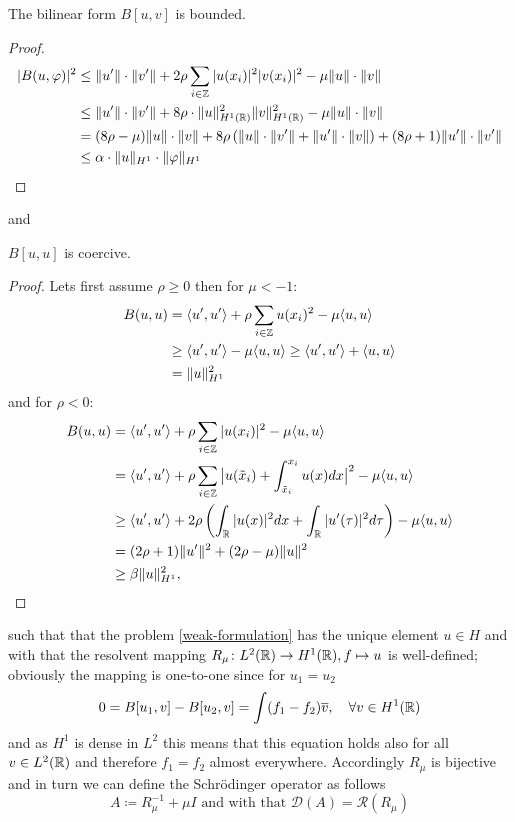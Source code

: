 \begin{theorem} \label{1.1}
	The bilinear form $B[u, v]$ is bounded.
	
	\begin{proof}
		\begin{align*}
			| B(u, \varphi)|^{2} & \leq \| u' \| \cdot \| v' \| + 2 \rho \sum_{i \in \mathbb{Z}} |u(x_{i})|^{2} |v(x_{i})|^{2} - \mu \| u \| \cdot \| v \| \\
				& \leq \| u' \| \cdot \| v' \| + 8 \rho \cdot \| u \|^{2}_{H^{1}(\mathbb{R})} \| v \|^{2}_{H^{1}(\mathbb{R})}  - \mu \| u \| \cdot \| v \| \\
				& = (8\rho - \mu) \| u \| \cdot \| v \| + 8\rho \left( \| u \| \cdot \| v' \| + \| u' \| \cdot \| v \| \right) + (8\rho + 1) \| u' \| \cdot \| v'\| \\
				& \leq \alpha \cdot \| u \|_{H^{1}} \cdot \| \varphi \|_{H^{1}}
		\end{align*}
	\end{proof}
\end{theorem}
and
\begin{theorem} \label{1.2}
	$B[u, u]$ is coercive.
	
	\begin{proof}
		Lets first assume $\rho \geq 0$ then for $\mu < -1$:
		\begin{align*}
			B(u, u) & = \langle u' , u' \rangle + \rho \sum_{i \in \mathbb{Z}} u(x_{i})^{2} - \mu \langle u , u \rangle \\
					& \geq \langle u' , u' \rangle - \mu \langle u , u \rangle \geq \langle u' , u' \rangle  + \langle u , u \rangle \\
					& = \| u \|_{H^{1}}^{2}
		\end{align*}
		and for $\rho < 0$:
		\begin{align*}
			B(u, u) & = \langle u' , u' \rangle + \rho \sum_{i \in \mathbb{Z}} |u(x_{i})|^{2} - \mu 	\langle u , u \rangle \\
					& = \langle u' , u' \rangle + \rho \sum_{i \in \mathbb{Z}} \big| u(\tilde{x}_{i}) + \int_{\tilde{x}_{i}}^{x_{i}} u(x) dx \big|^{2} - \mu \langle u , u \rangle \\
					& \geq \langle u' , u' \rangle + 2 \rho \left( \int_{\mathbb{R}} |u(x)|^{2} dx + \int_{\mathbb{R}} |u'(\tau)|^{2} d\tau \right) - \mu \langle u , u \rangle \\
					& = (2 \rho + 1) \| u' \|^{2} + (2\rho - \mu) \| u \|^{2}  \\
					& \geq \beta \| u \|_{H^{1}}^{2},
		\end{align*}
	\end{proof}
\end{theorem}
such that that the problem \eqref{weak-formulation} has the unique element $u \in H$ and with that the resolvent mapping $R_{\mu} \colon L^{2}(\mathbb{R}) \rightarrow H^{1}(\mathbb{R}), f \mapsto u$ is well-defined; obviously the mapping is one-to-one since for $u_{1} = u_{2}$
	\[ 0 = B[u_{1}, v] - B[u_{2}, v]= \int (f_{1} - f_{2}) \overline{v}, \quad \forall v \in H^{1}(\mathbb{R}) \]
and as $H^{1}$ is dense in $L^{2}$ this means that this equation holds also for all $v \in L^{2}(\mathbb{R})$ and therefore $f_{1} = f_{2}$ almost everywhere. Accordingly $R_{\mu}$ is bijective and in turn we can define the Schrödinger operator as follows
		\[ A \coloneqq R_{\mu}^{-1} + \mu I \text{ and with that } \mathcal{D}(A) = \mathcal{R}(R_{\mu}) \]